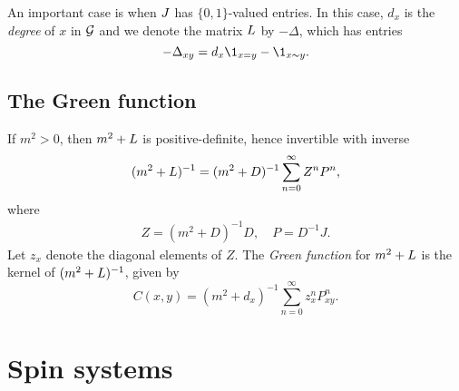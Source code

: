 \begin{example}
An important case is when $J$ has $\{0, 1 \}$-valued entries. In this case, $d_x$ is the \emph{degree} of $x$ in $\mathcal{G}$ and we denote the matrix $L$ by $-\Delta$, which has entries
\begin{equation}
-\Delta_{xy} = d_x \1_{x=y} - \1_{x \sim y}.
\end{equation}
\end{example}


\subsection{The Green function}

If $m^2 > 0$, then $m^2 + L$ is positive-definite, hence invertible with inverse
\begin{equation}
(m^2 + L)^{-1} = (m^2 + D)^{-1} \sum_{n=0}^\infty Z^n P^n,
\end{equation}
where
\begin{align}
Z = (m^2 + D)^{-1} D,
  \quad
P = D^{-1} J.
\end{align}
Let $z_x$ denote the diagonal elements of $Z$. The \emph{Green function} for
$m^2 + L$ is the kernel of $(m^2 + L)^{-1}$, given by
\begin{equation}
C(x, y)
  =
(m^2 + d_x)^{-1} \sum_{n=0}^\infty z_x^n P^n_{xy}.
\end{equation}




\section{Spin systems}

